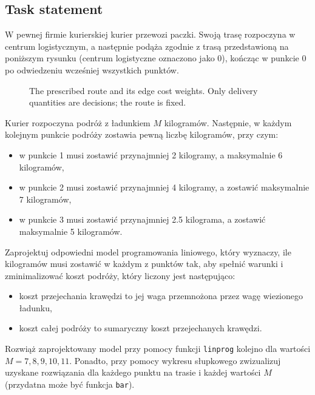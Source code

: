 \documentclass[11pt,a4paper]{article}
\begin{document}
\subsection{Task statement}
\begin{otherlanguage}{polish}
  W pewnej firmie kurierskiej kurier przewozi paczki. Swoją trasę rozpoczyna
  w centrum logistycznym, a następnie podąża zgodnie z trasą przedstawioną
  na poniższym rysunku (centrum logistyczne oznaczono jako 0), kończąc w punkcie
  0 po odwiedzeniu wcześniej wszystkich punktów.
\end{otherlanguage}
\begin{figure}[H]
  \centering
  \caption{The prescribed route and its edge cost weights. Only delivery
    quantities are decisions; the route is fixed.}
\end{figure}
\begin{otherlanguage}{polish}
  Kurier rozpoczyna podróż z ładunkiem $M$ kilogramów. Następnie, w każdym
  kolejnym punkcie podróży zostawia pewną liczbę kilogramów, przy czym:
  \begin{itemize}
    \item w punkcie 1 musi zostawić przynajmniej 2 kilogramy, a maksymalnie 6 kilogramów,
    \item w punkcie 2 musi zostawić przynajmniej 4 kilogramy, a zostawić maksymalnie 7 kilogramów,
    \item w punkcie 3 musi zostawić przynajmniej 2.5 kilograma, a zostawić maksymalnie 5 kilogramów.
  \end{itemize}
  Zaprojektuj odpowiedni model programowania liniowego, który wyznaczy, ile
  kilogramów musi zostawić w każdym z punktów tak, aby spełnić warunki i
  zminimalizować koszt podróży, który liczony jest następująco:
  \begin{itemize}
    \item koszt przejechania krawędzi to jej waga przemnożona przez wagę wiezionego ładunku,
    \item koszt całej podróży to sumaryczny koszt przejechanych krawędzi.
  \end{itemize}
  \begin{sloppypar}
    Rozwiąż zaprojektowany model przy pomocy funkcji \texttt{linprog} kolejno
    dla wartości $M=7,8,9,10,11$. Ponadto, przy pomocy wykresu słupkowego
    zwizualizuj uzyskane rozwiązania dla każdego punktu na trasie i każdej
    wartości $M$ (przydatna może być funkcja \texttt{bar}).
  \end{sloppypar}
\end{otherlanguage}
\end{document}
